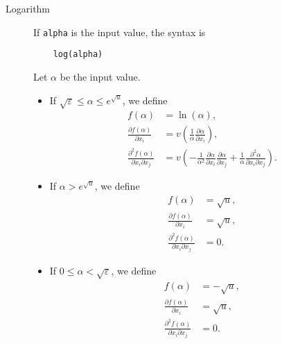\documentclass[12pt,a4paper]{article}
\begin{document}
\begin{description}
\item[Logarithm] If \lstinline+alpha+ is the input value, the syntax is
  \begin{lstlisting}
    log(alpha)
  \end{lstlisting}
  Let $\alpha$ be the input value.
  \begin{itemize}
  \item If $\sqrt{\varepsilon} \leq \alpha \leq e^{\sqrt{u}}$, we define
    \begin{align*}
    f(\alpha)& =\ln(\alpha), \\ 
    \frac{\partial f(\alpha)}{\partial x_i} &= v\left(\frac{1}{\alpha} \frac{\partial \alpha}{\partial x_i}\right), \\
    \frac{\partial^2 f(\alpha)}{\partial x_i \partial x_j} &=
    v\left(-\frac{1}{\alpha^{2}}
    \frac{\partial \alpha}{\partial x_i}
    \frac{\partial \alpha}{\partial x_j }
    + \frac{1}{\alpha}
    \frac{\partial^2 \alpha}{\partial x_i \partial x_j}
      \right).
    \end{align*}
  \item If $\alpha > e^{\sqrt{u}}$, we define 
    \begin{align*}
      f(\alpha) &= \sqrt{u}, \\
      \frac{\partial f(\alpha)}{\partial x_i} &= \sqrt{u},\\
      \frac{\partial^2 f(\alpha)}{\partial x_i \partial x_j} &= 0.
    \end{align*}
  \item If $0 \leq  \alpha < \sqrt{\varepsilon}$, we define
    \begin{align*}
      f(\alpha) &= -\sqrt{u}, \\
      \frac{\partial f(\alpha)}{\partial x_i} &= \sqrt{u},\\
      \frac{\partial^2 f(\alpha)}{\partial x_i\partial x_j} &= 0.\\
    \end{align*}
  \end{itemize}



\end{description}
\end{document}
